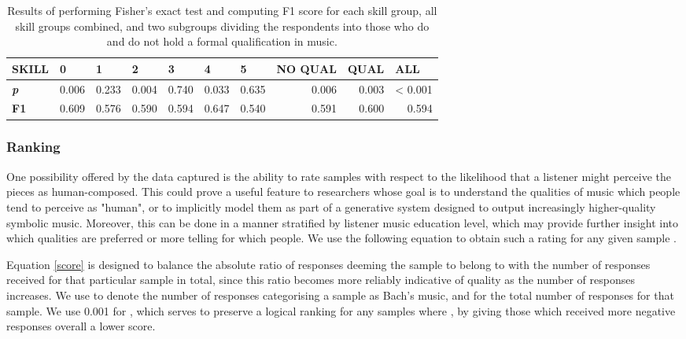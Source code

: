 \documentclass{article}
\begin{document}
\begin{table}
\centering
\caption{Results of performing Fisher's exact test and computing F1 score for each skill group, all skill groups combined, and two subgroups dividing the respondents into those who do and do not hold a formal qualification in music. \newline}
\label{tab:stats}
\begin{tabular}{l|rrrrrrrrr}
\textbf{SKILL}      & \multicolumn{1}{l}{0} & \multicolumn{1}{l}{1} & \multicolumn{1}{l}{2} & \multicolumn{1}{l}{3} & \multicolumn{1}{l}{4} & \multicolumn{1}{l}{5} & \multicolumn{1}{l}{NO QUAL} & \multicolumn{1}{l}{QUAL} & \multicolumn{1}{l}{ALL}  \\ 
\hline
\textbf{\textit{p}} & 0.006                 & 0.233                 & 0.004                 & 0.740                 & 0.033                 & 0.635                 & 0.006                       & 0.003                    & < 0.001                    \\
\textbf{F1}         & 0.609                 & 0.576                 & 0.590                 & 0.594                 & 0.647                 & 0.540                 & 0.591                       & 0.600                    & 0.594                   
\end{tabular}
\end{table}

\subsubsection{Ranking}

One possibility offered by the data captured is the ability to rate samples with respect to the likelihood that a listener might perceive the pieces as human-composed. This could prove a useful feature to researchers whose goal is to understand the qualities of music which people tend to perceive as "human", or to implicitly model them as part of a generative system designed to output increasingly higher-quality symbolic music. Moreover, this can be done in a manner stratified by listener music education level, which may provide further insight into which qualities are preferred or more telling for which people. We use the following equation to obtain such a rating  for any given sample .



Equation \ref{score} is designed to balance the absolute ratio of responses deeming the sample to belong to  with the number of responses received for that particular sample in total, since this ratio becomes more reliably indicative of quality as the number of responses increases. We use  to denote the number of responses categorising a sample as Bach's music, and  for the total number of responses for that sample. We use 0.001 for , which serves to preserve a logical ranking for any samples where , by giving those which received more negative responses overall a lower score.
\end{document}
